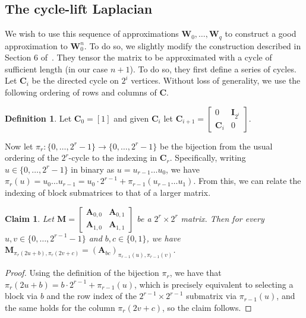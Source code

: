 \documentclass[11pt]{article}
\numberwithin{equation}{section}
\newtheorem{claim}[theorem]{Claim}
\theoremstyle{definition}
\newtheorem{definition}[theorem]{Definition}
\theoremstyle{plain}
\newcommand{\ra}{\rightarrow}
\newcommand{\mA}{\mathbf{A}}
\newcommand{\mC}{\mathbf{C}}
\newcommand{\mM}{\mathbf{M}}
\newcommand{\mW}{\mathbf{W}}
\newcommand{\I}{\mathbf{I}}
\begin{document}
\subsection{The cycle-lift Laplacian}
We wish to use this sequence of approximations $\mW_0,\ldots,\mW_q$ to construct a good approximation to $\mW_0^n$. To do so, we slightly modify the construction described in Section 6 of~\cite{AhmadinejadKeMuPeSiVa19}. They tensor the matrix to be approximated with a cycle of sufficient length (in our case $n+1$). To do so, they first define a series of cycles. Let $\mC_i$ be the directed cycle on $2^i$ vertices. Without loss of generality, we use the following ordering of rows and columns of $\mC$.

\begin{definition}
Let $\mC_0=[1]$ and given $\mC_i$ let $\mC_{i+1}=\begin{bmatrix}0&\I_{2^i}\\ \mC_{i}&0\end{bmatrix}$.
\end{definition}
Now let $\pi_r:\{0,\ldots,2^r-1\}\ra\{0,\ldots,2^r-1\}$ be the bijection from the usual ordering of the $2^r$-cycle to the indexing in $\mC_r$. Specifically, writing $u\in \{0,\ldots,2^{r}-1\}$ in binary as $u=u_{r-1}\ldots u_0$, we have $\pi_r(u)=u_0\ldots u_{r-1}=u_0\cdot 2^{r-1}+\pi_{r-1}(u_{r-1}\ldots u_1)$. From this, we can relate the indexing of block submatrices to that of a larger 
matrix. %
\begin{claim}\label{clm:indexStruct}
Let $\mM=\begin{bmatrix}\mA_{0,0} & \mA_{0,1}\\ \mA_{1,0} & \mA_{1,1}\end{bmatrix}$ be a $2^r\times 2^r$ matrix. Then for every $u,v\in \{0,\ldots,2^{r-1}-1\}$ and $b,c\in \{0,1\}$, we have $\mM_{\pi_r(2u+b),\pi_r(2v+c)}=(\mA_{bc})_{\pi_{r-1}(u),\pi_{r-1}(v)}$.
\end{claim}
\begin{proof}
Using the definition of the bijection $\pi_r$, we have that $\pi_r(2u+b)=b\cdot 2^{r-1}+\pi_{r-1}(u)$, which is precisely equivalent to selecting a block via $b$ and the row index of the $2^{r-1}\times 2^{r-1}$ submatrix via $\pi_{r-1}(u)$, and the same holds for the column $\pi_r(2v+c)$, so the claim follows.
\end{proof}
\end{document}
